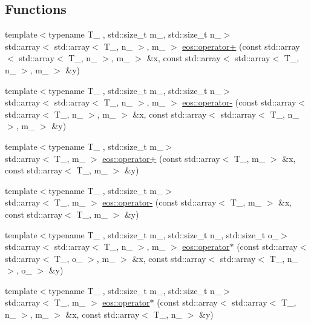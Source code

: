 \subsection*{Functions}
\begin{DoxyCompactItemize}
\item 
{\footnotesize template$<$typename T\_\- , std::size\_\-t m\_\-, std::size\_\-t n\_\-$>$ }\\std::array$<$ std::array$<$ T\_\-, n\_\- $>$, m\_\- $>$ \hyperlink{namespaceeos_a0e3f5e761fbf126d8fcda142fed73318}{eos::operator+} (const std::array$<$ std::array$<$ T\_\-, n\_\- $>$, m\_\- $>$ \&x, const std::array$<$ std::array$<$ T\_\-, n\_\- $>$, m\_\- $>$ \&y)
\item 
{\footnotesize template$<$typename T\_\- , std::size\_\-t m\_\-, std::size\_\-t n\_\-$>$ }\\std::array$<$ std::array$<$ T\_\-, n\_\- $>$, m\_\- $>$ \hyperlink{namespaceeos_acbf11d2b07d36a4c4a3abb8d58bceea3}{eos::operator-\/} (const std::array$<$ std::array$<$ T\_\-, n\_\- $>$, m\_\- $>$ \&x, const std::array$<$ std::array$<$ T\_\-, n\_\- $>$, m\_\- $>$ \&y)
\item 
{\footnotesize template$<$typename T\_\- , std::size\_\-t m\_\-$>$ }\\std::array$<$ T\_\-, m\_\- $>$ \hyperlink{namespaceeos_a77b0b1d58e1ff492fd660967a4dd6afa}{eos::operator+} (const std::array$<$ T\_\-, m\_\- $>$ \&x, const std::array$<$ T\_\-, m\_\- $>$ \&y)
\item 
{\footnotesize template$<$typename T\_\- , std::size\_\-t m\_\-$>$ }\\std::array$<$ T\_\-, m\_\- $>$ \hyperlink{namespaceeos_aa8fefb77f2ab33ac602411123a62b956}{eos::operator-\/} (const std::array$<$ T\_\-, m\_\- $>$ \&x, const std::array$<$ T\_\-, m\_\- $>$ \&y)
\item 
{\footnotesize template$<$typename T\_\- , std::size\_\-t m\_\-, std::size\_\-t n\_\-, std::size\_\-t o\_\-$>$ }\\std::array$<$ std::array$<$ T\_\-, n\_\- $>$, m\_\- $>$ \hyperlink{namespaceeos_a6025a42d446265afd81f6c749999a391}{eos::operator$\ast$} (const std::array$<$ std::array$<$ T\_\-, o\_\- $>$, m\_\- $>$ \&x, const std::array$<$ std::array$<$ T\_\-, n\_\- $>$, o\_\- $>$ \&y)
\item 
{\footnotesize template$<$typename T\_\- , std::size\_\-t m\_\-, std::size\_\-t n\_\-$>$ }\\std::array$<$ T\_\-, m\_\- $>$ \hyperlink{namespaceeos_adf0061c40e232b18c6cb38c998b4cde1}{eos::operator$\ast$} (const std::array$<$ std::array$<$ T\_\-, n\_\- $>$, m\_\- $>$ \&x, const std::array$<$ T\_\-, n\_\- $>$ \&y)

\end{DoxyCompactItemize}
